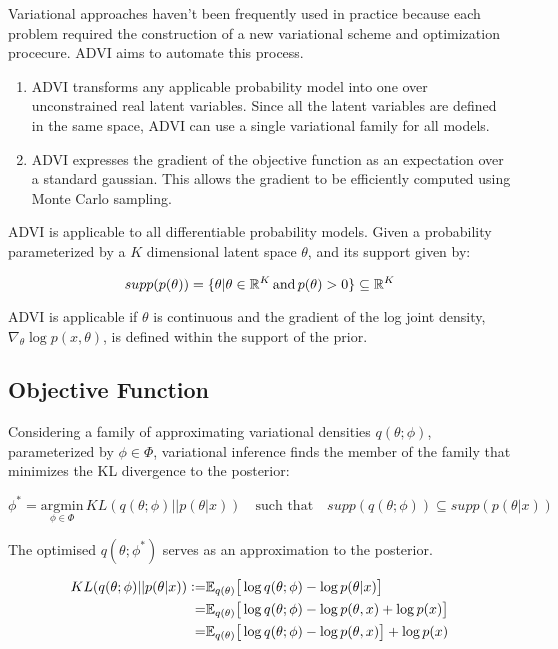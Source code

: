 \documentclass[10pt]{article}
\newcommand{\defeq}{\vcentcolon=}
\begin{document}
Variational approaches haven't been frequently used in practice because each problem required the construction of a new
variational scheme and optimization procecure. ADVI aims to automate this process. 

\begin{enumerate}
  \item ADVI transforms any applicable probability model into one over unconstrained real latent variables. Since all the 
  latent variables are defined in the same space, ADVI can use a single variational family for all models. 
  \item ADVI expresses the gradient of the objective function as an expectation over a standard gaussian. This allows
  the gradient to be efficiently computed using Monte Carlo sampling. 
\end{enumerate}

ADVI is applicable to all differentiable probability models. Given a probability parameterized by a $K$ dimensional 
latent space $\theta$, and its support given by:

\begin{equation}
  supp(p(\theta)) = \{\theta | \theta \in \mathbb{R}^K \, \text{and} \, p(\theta) > 0 \} \subseteq \mathbb{R} ^ K \notag
\end{equation}

ADVI is applicable if $\theta$ is continuous and the gradient of the log joint density, $\nabla_{\theta}\log p(x, \theta)$, 
is defined within the support of the prior.

\subsection*{Objective Function}

Considering a family of approximating variational densities $q(\theta ; \phi)$, parameterized by $\phi \in \Phi$, 
variational inference finds the member of the family that minimizes the KL divergence to the posterior:

\begin{equation*}
  \phi^* = \underset{\phi \in \Phi}{\text{argmin}}\, KL(q(\theta ; \phi) || p(\theta | x)) \quad \text{such that} \quad supp(q(\theta ; \phi)) \subseteq supp(p(\theta | x))
\end{equation*}

The optimised $q(\theta; \phi^*)$ serves as an approximation to the posterior. 

\begin{align*}
  KL(q(\theta ; \phi) || p(\theta | x)) \defeq &\mathbb{E}_{q(\theta)}\big[\log q(\theta;\phi) - \log p(\theta|x)  \big] \\
  =& \mathbb{E}_{q(\theta)}\big[\log q(\theta;\phi) - \log p(\theta, x) + \log p(x)\big] \\
  =& \mathbb{E}_{q(\theta)}\big[\log q(\theta;\phi) - \log p(\theta, x) \big] + \log p(x)
\end{align*}
\end{document}
